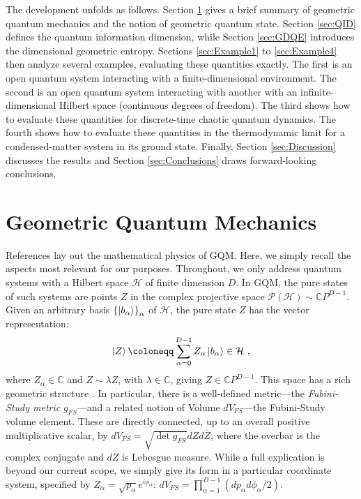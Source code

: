 \documentclass[draft,nofootinbib,pre,twocolumn,showkeys,superscriptaddress,preprintnumbers,floatfix]{revtex4-1}
\newcommand{\1}{\mathbbm{1}}
\newcommand{\PH}{\mathcal{P}(\mathcal{H})}
\begin{document}
The development unfolds as follows. Section \ref{sec:GQM} gives a brief summary
of geometric quantum mechanics and the notion of geometric quantum state.
Section \ref{sec:QID} defines the quantum information dimension, while Section
\ref{sec:GDQE} introduces the dimensional geometric entropy. Sections
\ref{sec:Example1} to \ref{sec:Example4} then analyze several examples,
evaluating these quantities exactly. The first is an open quantum system
interacting with a finite-dimensional environment. The second is an open
quantum system interacting with another with an infinite-dimensional Hilbert
space (continuous degrees of freedom). The third shows how to evaluate these
quantities for discrete-time chaotic quantum dynamics. The fourth shows how to
evaluate these quantities in the thermodynamic limit for a condensed-matter
system in its ground state. Finally, Section \ref{sec:Discussion} discusses the
results and Section \ref{sec:Conclusions} draws forward-looking conclusions.
 
\section{Geometric Quantum Mechanics}
\label{sec:GQM}

References
\cite{STROCCHI1966,Miel68,Kibble1979,Heslot1985,Page87,And90,Gibbons1992,Ashtekar1995,Ashtekar1999,Brody2001,Carinena2007,Chruscinski2006,Marmo2010,Avron2020,Pastorello2015,Pastorello2015a,Pastorello2016,Clemente-Gallardo2013}
lay out the mathematical physics of GQM. Here, we simply
recall the aspects most relevant for our purposes. Throughout, we only address
quantum systems with a Hilbert space $\mathcal{H}$ of finite dimension $D$. In
GQM, the pure states of such systems are points $Z$ in the complex projective
space $\PH \sim \mathbb{C}P^{D-1}$. Given an arbitrary basis
$\left\{\ket{b_{\alpha}}\right\}_{\alpha}$ of $\mathcal{H}$, the pure state
$Z$ has the vector representation:
\begin{align*}
\ket{Z} \coloneqq \sum_{\alpha=0}^{D-1} Z_\alpha \ket{b_\alpha}\in \mathcal{H}
  ~,
\end{align*}
where $Z_\alpha \in \mathbb{C}$ and $Z \sim \lambda Z$, with $\lambda \in
\mathbb{C}$, giving $Z\in \mathbb{C}P^{D-1}$. This space has a rich geometric structure \cite{Bengtsson2017}. In
particular, there is a well-defined metric---the \emph{Fubini-Study metric}
$g_{FS}$---and a related notion of Volume $dV_{FS}$---the Fubini-Study volume
element. These are directly connected, up to an overall positive multiplicative scalar, by 
$dV_{FS} = \sqrt{\det g_{FS}}dZ d\overline{Z}$, where the overbar is the complex conjugate 
and $dZ$ is Lebesgue measure. While a full explication is beyond our current scope, 
we simply give its form in a particular coordinate system, specified by $Z_\alpha =
\sqrt{p_\alpha}e^{i\phi_\alpha}$: $dV_{FS} = \prod_{\alpha=1}^{D-1}
\left(dp_\alpha d\phi_\alpha / 2\right)$. 
\end{document}
